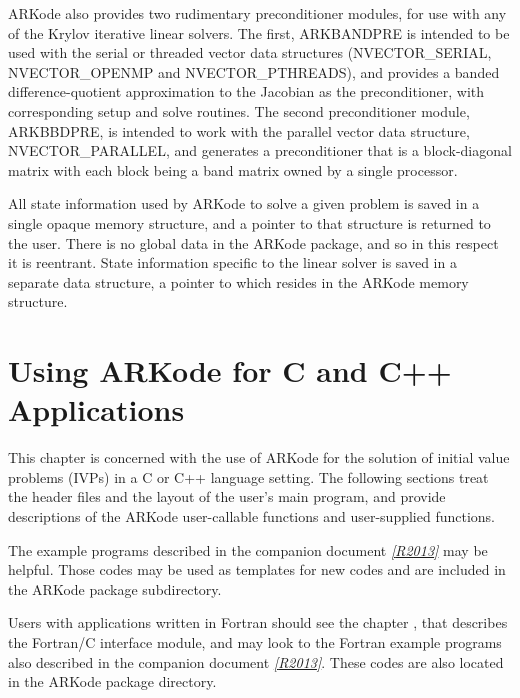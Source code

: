 \documentclass[letterpaper,10pt,english]{sphinxmanual}
\begin{document}
ARKode also provides two rudimentary preconditioner modules, for
use with any of the Krylov iterative linear solvers.  The first,
ARKBANDPRE is intended to be used with the serial or threaded vector
data structures (NVECTOR\_SERIAL, NVECTOR\_OPENMP and NVECTOR\_PTHREADS),
and provides a banded difference-quotient approximation to the
Jacobian as the preconditioner, with corresponding setup and solve
routines.  The second preconditioner module, ARKBBDPRE, is intended to
work with the parallel vector data structure, NVECTOR\_PARALLEL, and
generates a preconditioner that is a block-diagonal matrix with each
block being a band matrix owned by a single processor.

All state information used by ARKode to solve a given problem is
saved in a single opaque memory structure, and a pointer to that
structure is returned to the user.  There is no global data in the
ARKode package, and so in this respect it is reentrant.  State
information specific to the linear solver is saved in a separate data
structure, a pointer to which resides in the ARKode memory
structure.


\chapter{Using ARKode for C and C++ Applications}
\label{c_interface/index::doc}\label{c_interface/index:using-arkode-for-c-and-c-applications}\label{c_interface/index:cinterface}
This chapter is concerned with the use of ARKode for the solution
of initial value problems (IVPs) in a C or C++ language setting.  The
following sections treat the header files and the layout of the user's
main program, and provide descriptions of the ARKode user-callable
functions and user-supplied functions.

The example programs described in the companion document \label{c_interface/index:id1}{\hyperref[References:r2013]{\emph{{[}R2013{]}}}} may
be helpful. Those codes may be used as templates for new codes and are
included in the ARKode package  subdirectory.

Users with applications written in Fortran should see the chapter
{\hyperref[f_interface/index:fortraninterface]{\emph{}}}, that describes the Fortran/C interface
module, and may look to the Fortran example programs also described in
the companion document \label{c_interface/index:id2}{\hyperref[References:r2013]{\emph{{[}R2013{]}}}}.  These codes are also located in the
ARKode package  directory.
\end{document}
